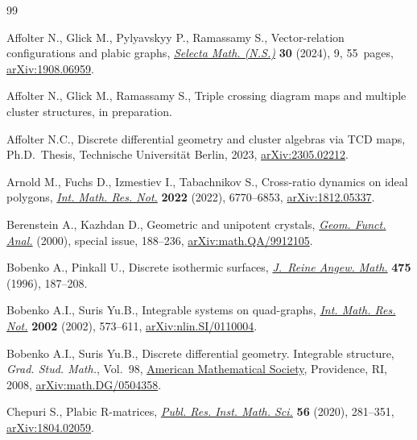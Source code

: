 \documentclass[pdftex]{sigma}
\numberwithin{equation}{section}
\begin{document}
%
%

\begin{thebibliography}{99}
\footnotesize\itemsep=0pt

Affolter N., Glick M., Pylyavskyy P., Ramassamy S., Vector-relation
 configurations and plabic graphs,
 \href{https://doi.org/10.1007/s00029-023-00898-z}{\textit{Selecta Math.
 (N.S.)}} \textbf{30} (2024), 9, 55~pages,
 \href{http://arxiv.org/abs/1908.06959}{arXiv:1908.06959}.

Affolter N., Glick M., Ramassamy S., Triple crossing diagram maps and multiple
 cluster structures, {i}n preparation.

Affolter N.C., Discrete differential geometry and cluster algebras via {TCD}
 maps, Ph.D.~Thesis, {T}echnische Universit\"at Berlin, 2023,
 \href{http://arxiv.org/abs/2305.02212}{arXiv:2305.02212}.

Arnold M., Fuchs D., Izmestiev I., Tabachnikov S., Cross-ratio dynamics on
 ideal polygons, \href{https://doi.org/10.1093/imrn/rnaa289}{\textit{Int.
 Math. Res. Not.}} \textbf{2022} (2022), 6770--6853,
 \href{http://arxiv.org/abs/1812.05337}{arXiv:1812.05337}.

Berenstein A., Kazhdan D., Geometric and unipotent crystals,
 \href{https://doi.org/10.1007/978-3-0346-0422-2_8}{\textit{Geom. Funct.
 Anal.}} (2000), special issue, 188--236,
 \href{http://arxiv.org/abs/math.QA/9912105}{arXiv:math.QA/9912105}.

Bobenko A., Pinkall U., Discrete isothermic surfaces,
 \href{https://doi.org/10.1515/crll.1996.475.187}{\textit{J.~Reine Angew.
 Math.}} \textbf{475} (1996), 187--208.

Bobenko A.I., Suris Yu.B., Integrable systems on quad-graphs,
 \href{https://doi.org/10.1155/S1073792802110075}{\textit{Int. Math. Res.
 Not.}} \textbf{2002} (2002), 573--611,
 \href{http://arxiv.org/abs/nlin.SI/0110004}{arXiv:nlin.SI/0110004}.

Bobenko A.I., Suris Yu.B., Discrete differential geometry. Integrable structure,
 \textit{Grad. Stud. Math.}, Vol.~98,
 \href{https://doi.org/10.1090/gsm/098}{American Mathematical Society},
 Providence, RI, 2008,
 \href{http://arxiv.org/abs/math.DG/0504358}{arXiv:math.DG/0504358}.

Chepuri S., Plabic {R}-matrices,
 \href{https://doi.org/10.4171/prims/56-2-2}{\textit{Publ. Res. Inst. Math.
 Sci.}} \textbf{56} (2020), 281--351,
 \href{http://arxiv.org/abs/1804.02059}{arXiv:1804.02059}.


\end{thebibliography}
\end{document}
